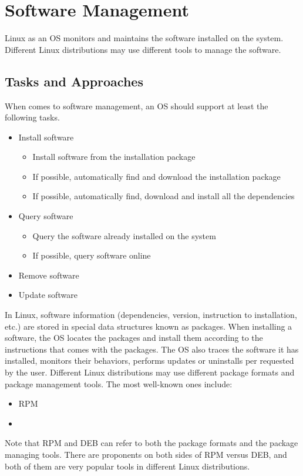 \chapter{Software Management} \label{ch:software-management}

Linux as an OS monitors and maintains the software installed on the system. Different Linux distributions may use different tools to manage the software.

\section{Tasks and Approaches}

When comes to software management, an OS should support at least the following tasks.
\begin{itemize}
	\item Install software
		\begin{itemize}
			\item Install software from the installation package
			\item If possible, automatically find and download the installation package
			\item If possible, automatically find, download and install all the dependencies
		\end{itemize}
	\item Query software
		\begin{itemize}
			\item Query the software already installed on the system
			\item If possible, query software online
		\end{itemize}
	\item Remove software
	\item Update software
\end{itemize}

In Linux, software information (dependencies, version, instruction to installation, etc.) are stored in special data structures known as packages. When installing a software, the OS locates the packages and install them according to the instructions that comes with the packages. The OS also traces the software it has installed, monitors their behaviors, performs updates or uninstalls per requested by the user. Different Linux distributions may use different package formats and package management tools. The most well-known ones include:
\begin{itemize}
	\item RPM
	\item {}
\end{itemize}
Note that RPM and DEB can refer to both the package formats and the package managing tools. There are proponents on both sides of RPM versus DEB, and both of them are very popular tools in different Linux distributions.

